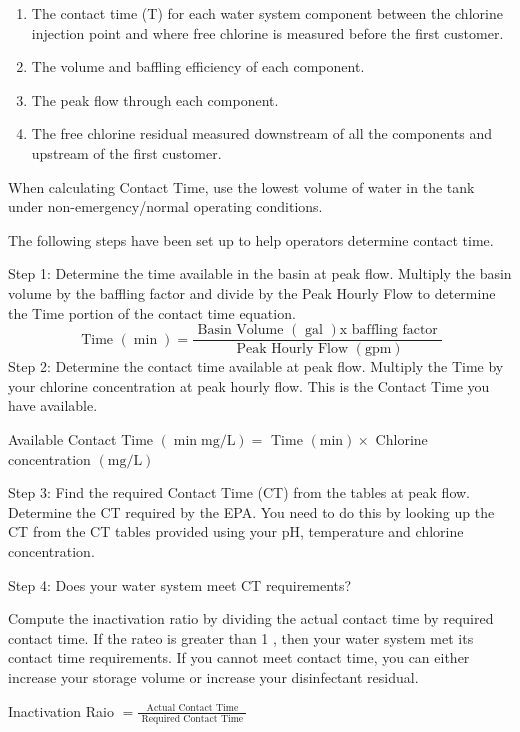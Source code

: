 \documentclass[10pt]{article}
\begin{document}
\begin{enumerate}
  \item The contact time (T) for each water system component between the chlorine injection point and where free chlorine is measured before the first customer.

  \item The volume and baffling efficiency of each component.

  \item The peak flow through each component.

  \item The free chlorine residual measured downstream of all the components and upstream of the first customer.

\end{enumerate}
When calculating Contact Time, use the lowest volume of water in the tank under non-emergency/normal operating conditions.

The following steps have been set up to help operators determine contact time.

Step 1: Determine the time available in the basin at peak flow. Multiply the basin volume by the baffling factor and divide by the Peak Hourly Flow to determine the Time portion of the contact time equation.
$$
\text { Time }(\min )=\frac{\text { Basin Volume }(\text { gal }) \mathrm{x} \text { baffling factor }}{\text { Peak Hourly Flow }(\mathrm{gpm})}
$$
Step 2: Determine the contact time available at peak flow. Multiply the Time by your chlorine concentration at peak hourly flow. This is the Contact Time you have available.

Available Contact Time $(\min \mathrm{mg} / \mathrm{L})=$ Time $(\mathrm{min}) \times$ Chlorine concentration $(\mathrm{mg} / \mathrm{L})$

Step 3: Find the required Contact Time (CT) from the tables at peak flow. Determine the CT required by the EPA. You need to do this by looking up the CT from the CT tables provided using your $\mathrm{pH}$, temperature and chlorine concentration.

Step 4: Does your water system meet CT requirements?

Compute the inactivation ratio by dividing the actual contact time by required contact time. If the rateo is greater than 1 , then your water system met its contact time requirements. If you cannot meet contact time, you can either increase your storage volume or increase your disinfectant residual.

Inactivation Raio $=\frac{\text { Actual Contact Time }}{\text { Required Contact Time }}$
\end{document}
